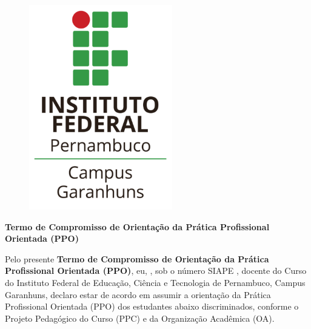 \documentclass[12pt, a4paper]{article}
\begin{document}
\begin{figure}
  \centering
  \includegraphics{logo-ifpe-garanhuns-mini}
\end{figure}

\vspace{1cm}

\begin{center}
  \LARGE
  \textbf{
    Termo de Compromisso de Orientação da Prática Profissional Orientada (PPO)
  }
\end{center}

\vspace{0.5cm}

\begin{justify}
Pelo presente \textbf{Termo de Compromisso de Orientação da Prática Profissional
Orientada (PPO)}, eu, \underline{\hspace{10cm}}, sob o número SIAPE
\underline{\hspace{3.7cm}}, docente do Curso \underline{\hspace{6cm}} \\
\underline{\hspace{4cm}} do Instituto Federal de Educação, Ciência e Tecnologia
de Pernambuco, Campus Garanhuns, declaro estar de acordo em assumir a orientação
da Prática Profissional Orientada (PPO) dos estudantes abaixo discriminados,
conforme o Projeto Pedagógico do Curso (PPC) e da Organização Acadêmica (OA).
\end{justify}

\vspace{1cm}
\end{document}
